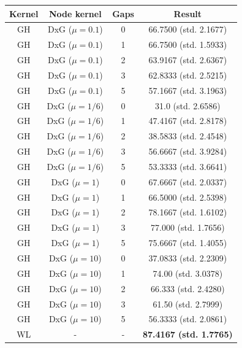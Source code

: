 \documentclass{article}
\begin{document}
\begin{minipage}[c]{0.5\linewidth}	
	\centering
	\begin{tabular}{c|c|c|c}
		Kernel & Node kernel & Gaps & Result\\
		\hline
		GH & DxG ($\mu=0.1$) & 0 & 66.7500 (std. 2.1677)\\
		GH & DxG ($\mu=0.1$) & 1 & 66.7500 (std. 1.5933)\\
		GH & DxG ($\mu=0.1$) & 2 & 63.9167 (std. 2.6367)\\
		GH & DxG ($\mu=0.1$) & 3 & 62.8333 (std. 2.5215)\\
		GH & DxG ($\mu=0.1$) & 5 & 57.1667 (std. 3.1963)\\
		GH & DxG ($\mu=1/6$) & 0 & 31.0 (std. 2.6586)\\
		GH & DxG ($\mu=1/6$) & 1 & 47.4167 (std. 2.8178)\\
		GH & DxG ($\mu=1/6$) & 2 & 38.5833 (std. 2.4548)\\
		GH & DxG ($\mu=1/6$) & 3 & 56.6667 (std. 3.9284)\\
		GH & DxG ($\mu=1/6$) & 5 & 53.3333 (std. 3.6641)\\
		GH & DxG ($\mu=1$) & 0 & 67.6667 (std. 2.0337)\\
		GH & DxG ($\mu=1$) & 1 & 66.5000 (std. 2.5398)\\
		GH & DxG ($\mu=1$) & 2 & 78.1667 (std. 1.6102)\\
		GH & DxG ($\mu=1$) & 3 & 77.000 (std. 1.7656)\\
		GH & DxG ($\mu=1$) & 5 & 75.6667 (std. 1.4055)\\
		GH & DxG ($\mu=10$) & 0 & 37.0833 (std. 2.2309)\\
		GH & DxG ($\mu=10$) & 1 & 74.00 (std. 3.0378)\\
		GH & DxG ($\mu=10$) & 2 & 66.333 (std. 2.4280)\\
		GH & DxG ($\mu=10$) & 3 & 61.50 (std. 2.7999)\\
		GH & DxG ($\mu=10$) & 5 & 56.3333 (std. 2.0861)\\
		
		WL & - & - & \textbf{87.4167 (std. 1.7765)}\\
	\end{tabular}
	\label{table:semi}
\end{minipage}
\end{document}
